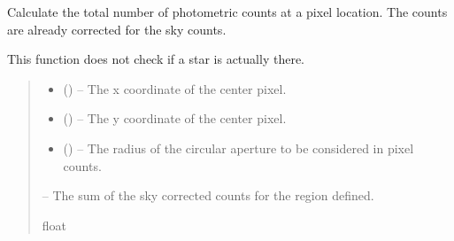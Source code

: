 \documentclass[letterpaper,11pt,english]{sphinxmanual}
\begin{document}
\begin{savenotes}
\begin{fulllineitems}

\begin{savenotes}\begin{fulllineitems}
\label{\detokenize{code/opihiexarata.photometry.solution:opihiexarata.photometry.solution.PhotometricSolution._calculate_star_photon_counts_pixel}}
\pysigstartsignatures
{}
\pysigstopsignatures
\sphinxAtStartPar
Calculate the total number of photometric counts at a pixel
location. The counts are already corrected for the sky counts.

\sphinxAtStartPar
This function does not check if a star is actually there.
\begin{quote}\begin{description}
\begin{itemize}
\item {} 
\sphinxAtStartPar
{} () – The x coordinate of the center pixel.

\item {} 
\sphinxAtStartPar
{} () – The y coordinate of the center pixel.

\item {} 
\sphinxAtStartPar
{} () – The radius of the circular aperture to be considered in pixel
counts.

\end{itemize}

\sphinxAtStartPar
{} – The sum of the sky corrected counts for the region defined.

\sphinxAtStartPar
float

\end{description}\end{quote}


\end{fulllineitems}
\end{savenotes}
\end{fulllineitems}
\end{savenotes}
\end{document}
